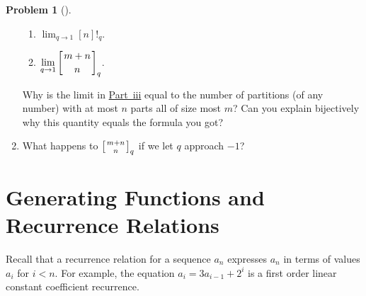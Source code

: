 \documentclass[10pt,]{book}
\theoremstyle{plain}
\theoremstyle{definition}
\newtheorem{activity}[project]{Problem}
\theoremstyle{definition}
\numberwithin{equation}{chapter}
\newcommand{\qchoose}[2]{\left[{#1\atop#2}\right]_q}
\newcommand{\lt}{<}
\begin{document}
\begin{activity}[]
\begin{enumerate}[font=\bfseries,label=(\alph*),ref=\alph*]
\begin{enumerate}[label=(\roman*)]
\item\hypertarget{li-71}{}\(\displaystyle\lim_{q\rightarrow 1} [n]!_q\).%
\item\hypertarget{q-binomial-lim}{}\(\displaystyle\lim_{q\rightarrow 1} \qchoose{m+n}{n}\).%
\end{enumerate}
 Why is the limit in \hyperlink{q-binomial-lim}{Part~iii} equal to the number of partitions (of any number) with at most \(n\) parts all of size most \(m\)? Can you explain bijectively why this quantity equals the formula you got?%
\item\label{task-156}  What happens to \(\qchoose{m+n}{n}\) if we let \(q\) approach \(-1\)?%
\end{enumerate}
\end{activity}
\typeout{************************************************}
\typeout{************************************************}
\section[{Generating Functions and Recurrence Relations}]{Generating Functions and Recurrence Relations}\label{sec_genfns-recurrence}
Recall that a recurrence relation for a sequence \(a_n\) expresses \(a_n\) in terms of values \(a_i\) for \(i\lt n\). For example, the equation \(a_i=3a_{i-1} +2^i\) is a first order linear constant coefficient recurrence.%
\typeout{************************************************}
\typeout{************************************************}
\end{document}
